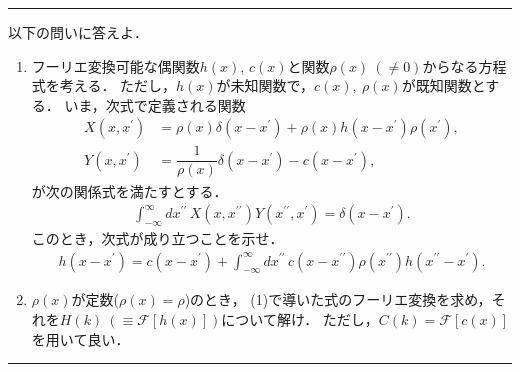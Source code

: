 \documentclass[11pt,a4]{jsarticle}
\numberwithin{equation}{section}
\begin{document}
%
\newpage
%
\hrule
\enshu
以下の問いに答えよ．
\begin{enumerate}[(1)]
  \item フーリエ変換可能な偶関数$h\left(x\right)$, $c\left(x\right)$と関数$\rho\left(x\right)~(\neq 0)$からなる方程式を考える．
	ただし，$h\left(x\right)$が未知関数で，$c(x),~\rho\left(x\right)$が既知関数とする．
	いま，次式で定義される関数
	\begin{align*}
	  X\left(x,x^{\prime}\right) &= \rho\left(x\right)\delta\left(x-x^\prime\right) + \rho\left(x\right)h\left(x-x^\prime\right)\rho\left(x^{\prime}\right), \\
	  Y\left(x,x^{\prime}\right) &= \dfrac{1}{\rho\left(x\right)}\delta\left(x-x^\prime\right)-c\left(x-x^\prime\right),
	\end{align*}
	が次の関係式を満たすとする．
	\begin{align*}
	  \int_{-\infty}^{\infty}dx^{\prime\prime}\,X(x,x^{\prime\prime})Y(x^{\prime\prime},x^{\prime}) = \delta\left(x-x^{\prime}\right).
	\end{align*}
	このとき，次式が成り立つことを示せ．
	\begin{align*}
	  h\left(x-x^{\prime}\right) = c\left(x-x^{\prime}\right) + \int_{-\infty}^{\infty}dx^{\prime\prime}\,c(x-x^{\prime\prime})\rho(x^{\prime\prime})h\left(x^{\prime\prime}-x^{\prime}\right).
	\end{align*}
  \item $\rho(x)$が定数($\rho(x) = \rho$)のとき，
	(1)で導いた式のフーリエ変換を求め，それを$H(k)~(\equiv \mathcal{F}\left[h(x)\right])$について解け．
	ただし，$C(k) = \mathcal{F}\left[c(x)\right]$を用いて良い．
\end{enumerate}
%
\hrule
\noindent
%
\end{document}
